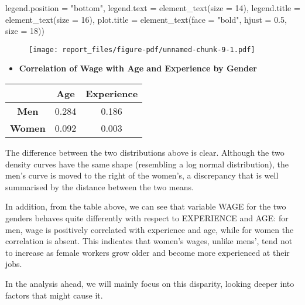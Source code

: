 \documentclass[
  letterpaper,
  DIV=11,
  numbers=noendperiod]{scrartcl}
\newenvironment{Shaded}{\begin{snugshade}}{\end{snugshade}}
\newcommand{\AttributeTok}[1]{\textcolor[rgb]{0.40,0.45,0.13}{#1}}
\newcommand{\DecValTok}[1]{\textcolor[rgb]{0.68,0.00,0.00}{#1}}
\newcommand{\FloatTok}[1]{\textcolor[rgb]{0.68,0.00,0.00}{#1}}
\newcommand{\FunctionTok}[1]{\textcolor[rgb]{0.28,0.35,0.67}{#1}}
\newcommand{\NormalTok}[1]{\textcolor[rgb]{0.00,0.23,0.31}{#1}}
\newcommand{\StringTok}[1]{\textcolor[rgb]{0.13,0.47,0.30}{#1}}
\providecommand{\tightlist}{%
  \setlength{\itemsep}{0pt}\setlength{\parskip}{0pt}}\usepackage{longtable,booktabs,array}
\begin{document}
\begin{Shaded}
\begin{Highlighting}[]
    \AttributeTok{legend.position =} \StringTok{"bottom"}\NormalTok{,}
    \AttributeTok{legend.text =} \FunctionTok{element\_text}\NormalTok{(}\AttributeTok{size =} \DecValTok{14}\NormalTok{),}
    \AttributeTok{legend.title =} \FunctionTok{element\_text}\NormalTok{(}\AttributeTok{size =} \DecValTok{16}\NormalTok{),}
    \AttributeTok{plot.title =} \FunctionTok{element\_text}\NormalTok{(}\AttributeTok{face =} \StringTok{"bold"}\NormalTok{, }\AttributeTok{hjust =} \FloatTok{0.5}\NormalTok{, }\AttributeTok{size =} \DecValTok{18}\NormalTok{))}
\end{Highlighting}
\end{Shaded}

\begin{figure}[H]

{\centering \texttt{[image: report\_files/figure-pdf/unnamed-chunk-9-1.pdf]}

}

\end{figure}

\begin{itemize}
\tightlist
\item
  \textbf{Correlation of Wage with Age and Experience by Gender}
\end{itemize}

\begin{longtable}[]{@{}ccc@{}}
\toprule\noalign{}
& Age & Experience \\
\midrule\noalign{}
\endhead
\bottomrule\noalign{}
\endlastfoot
\textbf{Men} & 0.284 & 0.186 \\
\textbf{Women} & 0.092 & 0.003 \\
\end{longtable}

The difference between the two distributions above is clear. Although
the two density curves have the same shape (resembling a log normal
distribution), the men's curve is moved to the right of the women's, a
discrepancy that is well summarised by the distance between the two
means.

In addition, from the table above, we can see that variable WAGE for the
two genders behaves quite differently with respect to EXPERIENCE and
AGE: for men, wage is positively correlated with experience and age,
while for women the correlation is absent. This indicates that women's
wages, unlike mens', tend not to increase as female workers grow older
and become more experienced at their jobs.

In the analysis ahead, we will mainly focus on this disparity, looking
deeper into factors that might cause it.
\end{document}
